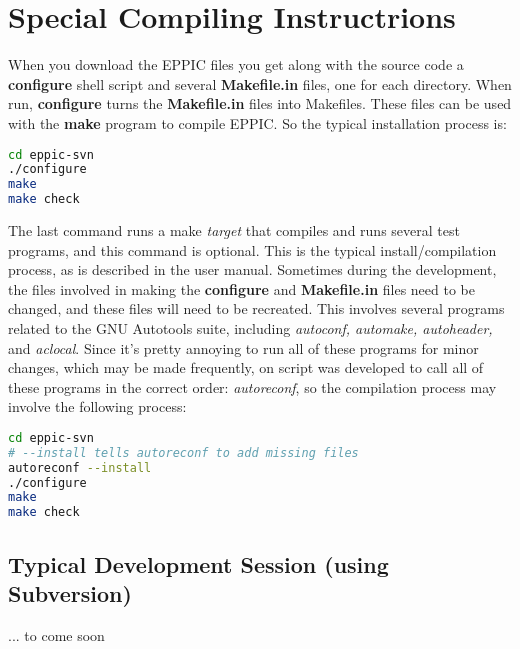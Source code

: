 \section{Special Compiling Instructrions}

When you download the EPPIC files you get along with the source code
a \textbf{configure} shell script and several \textbf{Makefile.in}
files, one for each directory. When run, \textbf{configure} turns the
\textbf{Makefile.in} files into Makefiles. These files can be used
with the \textbf{make} program to compile EPPIC. So the typical
installation process is:

\begin{lstlisting}[language=BASH]
cd eppic-svn
./configure
make 
make check
\end{lstlisting}

The last command runs a make \emph{target} that compiles and runs
several test programs, and this command is optional. This is the
typical install/compilation process, as is described in the user
manual. Sometimes during the development, the files involved in making
the \textbf{configure} and \textbf{Makefile.in} files need to be
changed, and these files will need to be recreated. This involves
several programs related to the GNU Autotools suite, including
\emph{autoconf, automake, autoheader,} and \emph{aclocal}. Since it's
pretty annoying to run all of these programs for minor changes, which
may be made frequently, on script was developed to call all of these
programs in the correct order: \emph{autoreconf}, so the compilation
process may involve the following process: 

\begin{lstlisting}[language=BASH]
cd eppic-svn
# --install tells autoreconf to add missing files
autoreconf --install
./configure
make 
make check
\end{lstlisting}

\subsection{Typical Development Session (using Subversion)}

... to come soon



